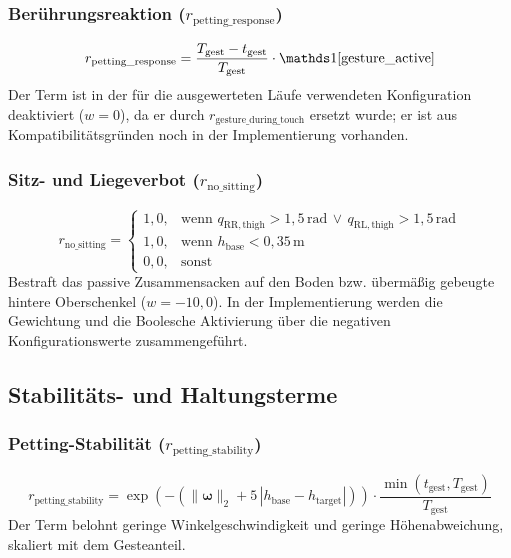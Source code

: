 \subsubsection{Berührungsreaktion ($r_{\text{petting\_response}}$)}
\begin{equation}\label{eq:pet_response_math}
r_{\text{petting\_response}} = \frac{T_{\text{gest}} - t_{\text{gest}}}{T_{\text{gest}}} \cdot \ind[\text{gesture\_active}]
\end{equation}
Der Term ist in der für die ausgewerteten Läufe verwendeten Konfiguration deaktiviert ($w=0$), da er durch $r_{\text{gesture\_during\_touch}}$ ersetzt wurde; er ist aus Kompatibilitätsgründen noch in der Implementierung vorhanden.

\subsubsection{Sitz- und Liegeverbot ($r_{\text{no\_sitting}}$)}
\begin{equation}\label{eq:pet_no_sitting_math}
r_{\text{no\_sitting}} = \begin{cases}
	1{,}0, & \text{wenn } q_{\mathrm{RR,thigh}}>1{,}5\,\text{rad} \,\lor\, q_{\mathrm{RL,thigh}}>1{,}5\,\text{rad} \\
	1{,}0, & \text{wenn } h_{\text{base}}<0{,}35\,\text{m} \\
	0{,}0, & \text{sonst}
\end{cases}
\end{equation}
Bestraft das passive Zusammensacken auf den Boden bzw. übermäßig gebeugte hintere Oberschenkel ($w = -10{,}0$). In der Implementierung werden die Gewichtung und die Boolesche Aktivierung über die negativen Konfigurationswerte zusammengeführt.

\subsection{Stabilitäts- und Haltungsterme}

\subsubsection{Petting-Stabilität ($r_{\text{petting\_stability}}$)}
\begin{equation}\label{eq:pet_stability_math}
r_{\text{petting\_stability}} = \exp\!\left(-\left(\lVert \boldsymbol{\omega}\rVert_2 + 5\,|h_{\text{base}}-h_{\text{target}}|\right)\right)\cdot \frac{\min(t_{\text{gest}},T_{\text{gest}})}{T_{\text{gest}}}
\end{equation}
Der Term belohnt geringe Winkelgeschwindigkeit und geringe Höhenabweichung, skaliert mit dem Gesteanteil.

